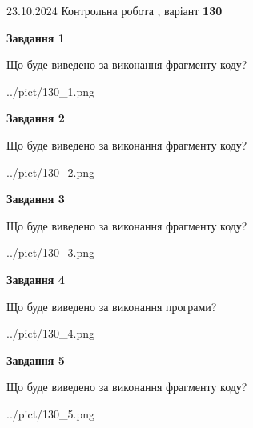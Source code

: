 \documentclass[12pt, ukrainian]{article}
\begin{document}
{\Large{23.10.2024 Контрольна робота , варіант  \No \textbf { 130 }\par}}
{
\begin {large}
{\begin {center}\textbf{Завдання 1}\end {center}}

Що буде виведено за виконання фрагменту коду?\par
\begin{center}
	{../pict/130_1.png}
\end{center}
\newpage

{\begin {center}\textbf{Завдання 2}\end {center}}

Що буде виведено за виконання фрагменту коду?\par
\begin{center}
	{../pict/130_2.png}
\end{center}
\newpage

{\begin {center}\textbf{Завдання 3}\end {center}}

Що буде виведено за виконання фрагменту коду?\par
\begin{center}
	{../pict/130_3.png}
\end{center}
\newpage

{\begin {center}\textbf{Завдання 4}\end {center}}

Що буде виведено за виконання програми?\par
\begin{center}
	{../pict/130_4.png}
\end{center}
\newpage

{\begin {center}\textbf{Завдання 5}\end {center}}

Що буде виведено за виконання фрагменту коду?\par
\begin{center}
	{../pict/130_5.png}
\end{center}
\newpage


\end{large}}
\end{document}
